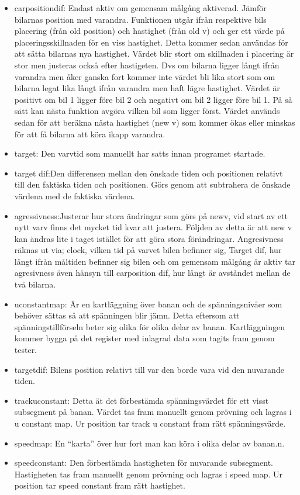 \begin{itemize}
      \item car\textunderscore position\textunderscore dif: Endast aktiv om gemensam målgång aktiverad. Jämför bilarnas position med varandra. Funktionen utgår ifrån respektive bils placering (från old position) och hastighet (från old v) 
och ger ett värde på placeringsskillnaden för en viss hastighet. Detta kommer
sedan användas för att sätta bilarnas nya hastighet. Värdet blir stort om skillnaden i placering är stor men justeras också efter hastigeten. Dvs om bilarna ligger långt ifrån varandra men åker ganska fort kommer inte värdet bli lika stort som om bilarna legat lika långt ifrån varandra men haft lägre hastighet. Värdet är positivt om bil 1 ligger före bil 2 och negativt om bil 2 ligger före bil 1. På så sätt kan nästa funktion avgöra vilken bil som ligger först.
Värdet används sedan för att beräkna nästa hastighet (new v) som kommer ökas eller minskas för att få bilarna att köra ikapp varandra. 

      \item target: Den varvtid som manuellt har satts innan programet startade.
      \item target dif:Den differensen mellan den önskade tiden och positionen relativt till den faktiska tiden och positionen. Görs genom att subtrahera de önskade värdena med de faktiska värdena.  
      \item agressivness:Justerar hur stora ändringar som görs på new\textunderscore v, vid start av ett nytt varv finns det mycket tid kvar att justera. Följden av detta är att new \textunderscore v kan ändras lite i taget istället för att göra stora förändringar. Angresivness räknas ut via; clock,  vilken tid på varvet bilen befinner sig, Target \textunderscore dif,  hur långt ifrån måltiden befinner sig bilen och om gemensam målgång är aktiv tar agresivness även hänsyn till car\textunderscore position \textunderscore dif,  hur långt är avståndet mellan de två bilarna. 
      \item u\textunderscore constant\textunderscore map: Är en kartläggning över banan och de spänningsnivåer som behöver sättas så att spänningen blir jämn. Detta eftersom att spänningstillförseln beter sig olika för olika delar av banan. Kartläggningen kommer bygga på det register med inlagrad data som tagits fram genom tester.
      \item target\textunderscore dif: Bilens position relativt till var den borde vara vid den nuvarande tiden.
      \item track\textunderscore u\textunderscore constant: Detta ät det förbestämda spänningsvärdet för ett visst subsegment på banan. Värdet tas fram manuellt genom prövning och lagras i u \textunderscore constant \textunderscore map. Ur position tar track \textunderscore u \textunderscore constant fram rätt spänningsvärde. 
      \item speed\textunderscore map: En ``karta'' över hur fort man kan köra i olika delar av banan.n.
      \item speed\textunderscore constant: Den förbestämda hastigheten för nuvarande subsegment. Hastigheten tas fram manuellt genom prövning och lagras i speed \textunderscore map. Ur position tar speed \textunderscore constant fram rätt hastighet. 


\end{itemize}
